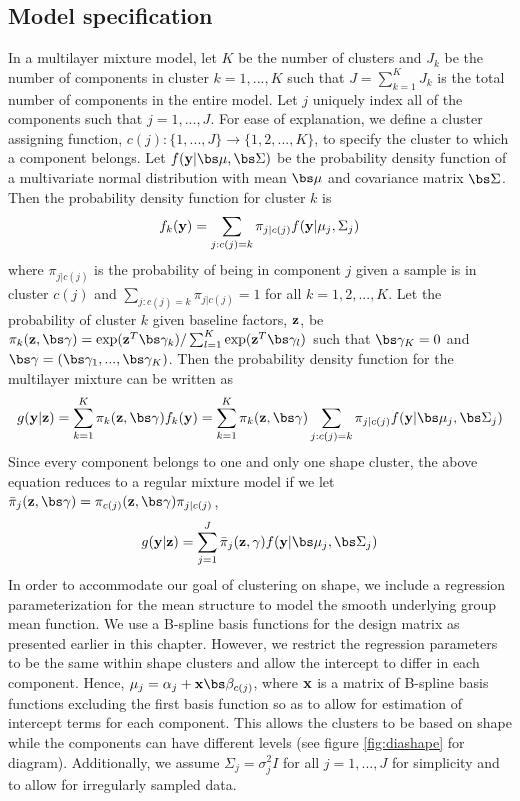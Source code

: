 \subsection{Model specification}
In a multilayer mixture model, let $K$ be the number of clusters and $J_{k}$ be the number of components in cluster $k=1,...,K$ such that $J=\sum_{k=1}^{K}J_{k}$ is the total number of components in the entire model. Let $j$ uniquely index all of the components such that $j=1,...,J$. For ease of explanation, we define a cluster assigning function, $c(j):\{1,...,J\}\rightarrow \{1,2,...,K\}$, to specify the cluster to which a component belongs. Let $f(\B y|\bs\mu,\bs\Sigma)$ be the probability density function of a multivariate normal distribution with mean $\bs\mu$ and covariance matrix $\bs\Sigma$. Then the probability density function for cluster $k$ is
$$f_{k}(\mathbf y) = \sum_{j: c(j) = k} \pi_{j|c(j)}f(\mathbf y|\mu_{j},\Sigma_{j})$$
where $\pi_{j|c(j)}$ is the probability of being in component $j$ given a sample is in cluster $c(j)$ and $\sum_{j: c(j) = k}\pi_{j|c(j)}=1$ for all $k=1,2,...,K$. Let the probability of cluster $k$ given baseline factors, $\mathbf z$, be $\pi_{k}(\B z,\bs\gamma)=\exp(\B z^{T}\bs\gamma_{k})/\sum^{K}_{l=1}\exp(\B z^{T}\bs\gamma_{l})$ such that $\bs\gamma_{K}=0$ and $\bs\gamma=(\bs\gamma_{1},...,\bs\gamma_{K})$. Then the probability density function for the multilayer mixture can be written as
$$g(\B y|\B z) = \sum_{k=1}^{K}\pi_{k}(\B z,\bs \gamma)f_{k}(\B y) = \sum_{k=1}^{K}\pi_{k}(\B z,\bs\gamma)\sum_{j: c(j) = k} \pi_{j|c(j)}f( \B y| \bs\mu_{j},\bs\Sigma_{j})$$
Since every component belongs to one and only one shape cluster, the above equation reduces to a regular mixture model if we let $\bar{\pi}_{j}(\B z,\bs \gamma)=\pi_{c(j)}(\B z,\bs\gamma)\pi_{j|c(j)}$,
$$g(\B y|\B z) = \sum_{j=1}^{J}\bar{\pi}_{j}(\B z,\gamma)f(\B y|\bs \mu_{j},\bs\Sigma_{j})$$
In order to accommodate our goal of clustering on shape, we include a regression parameterization for the mean structure to model the smooth underlying group mean function. We use a B-spline basis functions for the design matrix as presented earlier in this chapter. However, we restrict the regression parameters to be the same within shape clusters and allow the intercept to differ in each component. Hence, $\mu_{j}=\alpha_{j}+\B x \bs\beta_{c(j)}$, where $\mathbf x$ is a matrix of B-spline basis functions excluding the first basis function so as to allow for estimation of intercept terms for each component. This allows the clusters to be based on shape while the components can have different levels (see figure \ref{fig:diashape} for diagram). Additionally, we assume $\Sigma_{j}=\sigma^{2}_{j}I$ for all $j=1,...,J$  for simplicity and to allow for irregularly sampled data.

